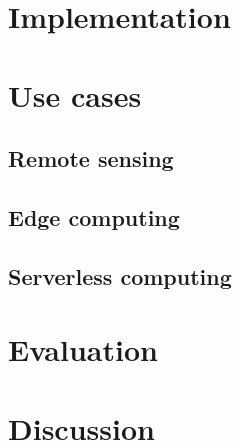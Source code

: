 \documentclass{article}
\begin{document}
\section{Implementation}

\section{Use cases}
\subsection{Remote sensing}
\subsection{Edge computing}
\subsection{Serverless computing}
\label{faas}

\section{Evaluation}
\section{Discussion}


 
\end{document}
